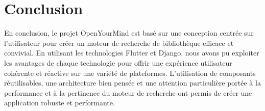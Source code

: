\newpage

\section{Conclusion}\label{conclusion}

En conclusion, le projet OpenYourMind est basé sur une conception
centrée sur l'utilisateur pour créer un moteur de recherche de
bibliothèque efficace et convivial. En utilisant les technologies
Flutter et Django, nous avons pu exploiter les avantages de chaque
technologie pour offrir une expérience utilisateur cohérente et réactive
sur une variété de plateformes. L'utilisation de composants
réutilisables, une architecture bien pensée et une attention
particulière portée à la performance et à la pertinence du moteur de
recherche ont permis de créer une application robuste et performante.
